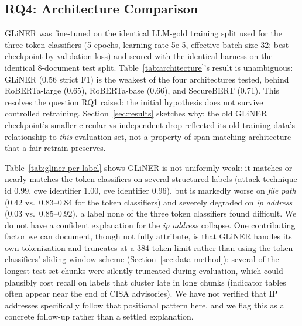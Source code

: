 \documentclass[11pt]{article}
\begin{document}
\subsection{RQ4: Architecture Comparison}
\label{sec:rq4}

GLiNER was fine-tuned on the identical LLM-gold training split used for the
three token classifiers (5 epochs, learning rate 5e-5, effective batch size
32; best checkpoint by validation loss) and scored with the identical
harness on the identical 8-document test split.
Table~\ref{tab:architecture}'s result is unambiguous: GLiNER (0.56 strict
F1) is the weakest of the four architectures tested, behind RoBERTa-large
(0.65), RoBERTa-base (0.66), and SecureBERT (0.71). This resolves the
question RQ1 raised: the initial hypothesis does not survive controlled
retraining. Section~\ref{sec:results} sketches why: the
old GLiNER checkpoint's smaller circular-vs-independent drop reflected its
old training data's relationship to \emph{this} evaluation set, not a
property of span-matching architecture that a fair retrain preserves.

Table~\ref{tab:gliner-per-label} shows GLiNER is not uniformly weak: it
matches or nearly matches the token classifiers on several structured
labels (attack technique id 0.99, cwe identifier 1.00, cve identifier
0.96), but is markedly worse on \emph{file path} (0.42 vs.\ 0.83--0.84 for
the token classifiers) and severely degraded on \emph{ip address} (0.03
vs.\ 0.85--0.92), a label none of the three token classifiers found
difficult. We do not have a confident explanation for the \emph{ip address}
collapse. One contributing factor we can document, though not fully
attribute, is that GLiNER handles its own tokenization and truncates at a
384-token limit rather than using the token classifiers' sliding-window
scheme (Section~\ref{sec:data-method}): several of the longest test-set
chunks were silently truncated during evaluation, which could plausibly
cost recall on labels that cluster late in long chunks (indicator tables
often appear near the end of CISA advisories). We have not verified that IP
addresses specifically follow that positional pattern here, and we flag
this as a concrete follow-up rather than a settled explanation.
\end{document}
